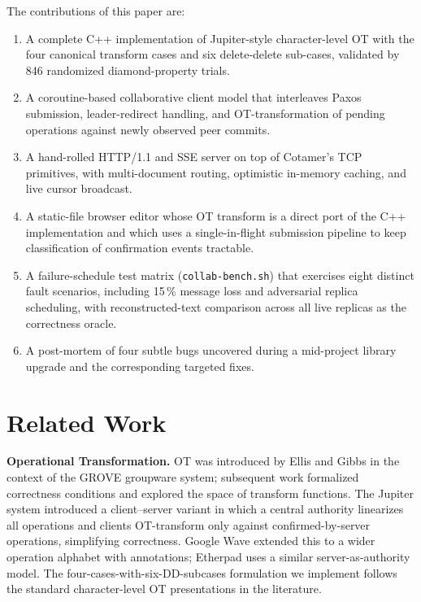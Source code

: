 \documentclass[11pt]{article}
\newcommand{\code}[1]{\texttt{#1}}
\begin{document}
The contributions of this paper are:
\begin{enumerate}[leftmargin=*,itemsep=0.1em]
  \item A complete C++ implementation of Jupiter-style character-level OT with the four canonical transform cases and six delete-delete sub-cases, validated by 846 randomized diamond-property trials.
  \item A coroutine-based collaborative client model that interleaves Paxos submission, leader-redirect handling, and OT-transformation of pending operations against newly observed peer commits.
  \item A hand-rolled HTTP/1.1 and SSE server on top of Cotamer's TCP primitives, with multi-document routing, optimistic in-memory caching, and live cursor broadcast.
  \item A static-file browser editor whose OT transform is a direct port of the C++ implementation and which uses a single-in-flight submission pipeline to keep classification of confirmation events tractable.
  \item A failure-schedule test matrix (\code{collab-bench.sh}) that exercises eight distinct fault scenarios, including 15\,\% message loss and adversarial replica scheduling, with reconstructed-text comparison across all live replicas as the correctness oracle.
  \item A post-mortem of four subtle bugs uncovered during a mid-project library upgrade and the corresponding targeted fixes.
\end{enumerate}

\section{Related Work}

\textbf{Operational Transformation.} OT was introduced by Ellis and Gibbs \cite{ellis-gibbs} in the context of the GROVE groupware system; subsequent work formalized correctness conditions and explored the space of transform functions. The Jupiter system \cite{jupiter} introduced a client--server variant in which a central authority linearizes all operations and clients OT-transform only against confirmed-by-server operations, simplifying correctness. Google Wave \cite{wave} extended this to a wider operation alphabet with annotations; Etherpad uses a similar server-as-authority model. The four-cases-with-six-DD-subcases formulation we implement follows the standard character-level OT presentations in the literature.
\end{document}
